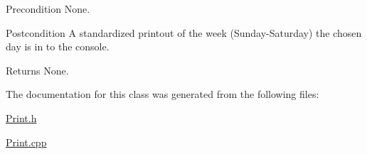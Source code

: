 \begin{DoxyPrecond}{Precondition}
None. 
\end{DoxyPrecond}
\begin{DoxyPostcond}{Postcondition}
A standardized printout of the week (Sunday-\/\-Saturday) the chosen day is in to the console. 
\end{DoxyPostcond}
\begin{DoxyReturn}{Returns}
None. 
\end{DoxyReturn}


The documentation for this class was generated from the following files\-:\begin{DoxyCompactItemize}
\item 
\hyperlink{Print_8h}{Print.\-h}\item 
\hyperlink{Print_8cpp}{Print.\-cpp}\end{DoxyCompactItemize}
